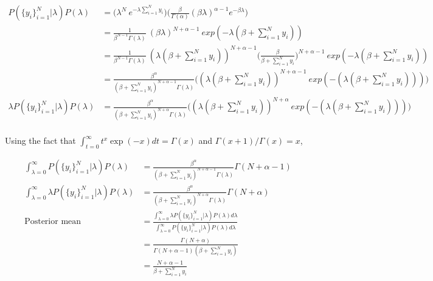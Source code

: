 \documentclass[11pt, fleqn]{article}
\begin{document}
\begin{equation*}
    \begin{aligned}
        P(\{y_i\}_{i=1}^N|\lambda) P(\lambda) &= \bigg( \lambda^N \  e^{-\lambda \sum_{i=1}^N y_i} \bigg) \bigg( \frac{\beta}{\Gamma(\alpha)} (\beta\lambda)^{\alpha-1} e^{-\beta\lambda} \bigg) \\
            &= \frac{1}{\beta^{N-1} \Gamma(\lambda)}\  (\beta\lambda)^{N+\alpha-1}\ exp(-\lambda (\beta + \sum_{i=1}^N y_i)) \\
            &= \frac{1}{\beta^{N-1} \Gamma(\lambda)}\ (\lambda(\beta + \sum_{i=1}^N y_i))^{N+\alpha-1} \bigg(\frac{\beta}{\beta + \sum_{i=1}^N y_i}\bigg)^{N+\alpha-1}\ exp(-\lambda (\beta + \sum_{i=1}^N y_i)) \\
            &= \frac{\beta^\alpha}{(\beta + \sum_{i=1}^N y_i)^{N+\alpha-1} \Gamma(\lambda)} \bigg( (\lambda (\beta + \sum_{i=1}^N y_i))^{N+\alpha-1}\ exp(- (\lambda (\beta + \sum_{i=1}^N y_i))) \bigg) \\
        \lambda P(\{y_i\}_{i=1}^N|\lambda) P(\lambda) &= \frac{\beta^\alpha}{(\beta + \sum_{i=1}^N y_i)^{N+\alpha} \Gamma(\lambda)} \bigg( (\lambda (\beta + \sum_{i=1}^N y_i))^{N+\alpha}\ exp(- (\lambda (\beta + \sum_{i=1}^N y_i))) \bigg) \\
    \end{aligned}
\end{equation*}

Using the fact that $\int_{t=0}^\infty t^x \exp(-x) dt = \Gamma(x)$ and $\Gamma(x+1)/\Gamma(x) = x$,

\begin{equation*}
    \begin{aligned}
        \int_{\lambda=0}^\infty P(\{y_i\}_{i=1}^N|\lambda) P(\lambda) &= \frac{\beta^\alpha}{(\beta + \sum_{i=1}^N y_i)^{N+\alpha-1} \Gamma(\lambda)} \Gamma(N+\alpha-1) \\
        \int_{\lambda=0}^\infty \lambda P(\{y_i\}_{i=1}^N|\lambda) P(\lambda) &= \frac{\beta^\alpha}{(\beta + \sum_{i=1}^N y_i)^{N+\alpha} \Gamma(\lambda)} \Gamma(N+\alpha) \\
        \text{Posterior mean } &= \frac{\int_{\lambda=0}^{\infty} \lambda P(\{y_i\}_{i=1}^N|\lambda) P(\lambda) d\lambda}{\int_{\lambda=0}^{\infty} P(\{y_i\}_{i=1}^N|\lambda) P(\lambda) d\lambda} \\
            &= \frac{\Gamma(N+\alpha)}{\Gamma(N+\alpha-1)(\beta + \sum_{i=1}^N y_i)} \\
            &= \frac{N+\alpha-1}{\beta + \sum_{i=1}^N y_i}
    \end{aligned}
\end{equation*}
\end{document}

